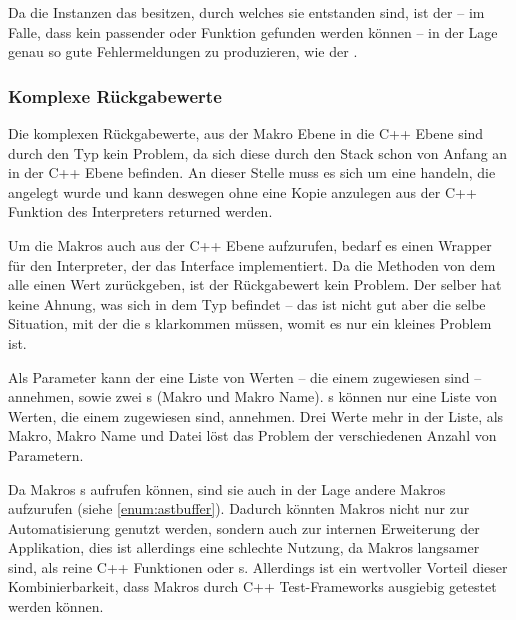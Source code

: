 {      Da die  Instanzen das  besitzen, durch welches sie entstanden sind, ist der  -- im Falle, dass kein passender  oder Funktion gefunden werden können -- in der Lage genau so gute Fehlermeldungen zu produzieren, wie der .

    \subsubsection{Komplexe Rückgabewerte}
    \label{sssec:Komplexe Rückgabewerte}
      Die komplexen Rückgabewerte, aus der Makro Ebene in die C++ Ebene sind durch den  Typ kein Problem, da sich diese durch den Stack schon von Anfang an in der C++ Ebene befinden. An dieser Stelle muss es sich um eine  handeln, die angelegt wurde und kann deswegen ohne eine Kopie anzulegen aus der C++ Funktion des Interpreters returned werden.

      Um die Makros auch aus der C++ Ebene aufzurufen, bedarf es einen Wrapper für den Interpreter, der das  Interface implementiert. Da die  Methoden von dem  alle einen  Wert zurückgeben, ist der Rückgabewert kein Problem. Der  selber hat keine Ahnung, was sich in dem  Typ befindet -- das ist nicht gut aber die selbe Situation, mit der die s klarkommen müssen, womit es nur ein kleines Problem ist.

      Als Parameter kann der  eine Liste von  Werten -- die einem  zugewiesen sind -- annehmen, sowie zwei s (Makro und Makro Name). s können nur eine Liste von  Werten, die einem  zugewiesen sind, annehmen. Drei  Werte mehr in der Liste, als Makro, Makro Name und Datei löst das Problem der verschiedenen Anzahl von Parametern.

      Da Makros s aufrufen können, sind sie auch in der Lage andere Makros aufzurufen (siehe \ref{enum:astbuffer}). Dadurch könnten Makros nicht nur zur Automatisierung genutzt werden, sondern auch zur internen Erweiterung der Applikation, dies ist allerdings eine schlechte Nutzung, da Makros langsamer sind, als reine C++ Funktionen oder s. Allerdings ist ein wertvoller Vorteil dieser Kombinierbarkeit, dass Makros durch C++ Test-Frameworks ausgiebig getestet werden können.

}
